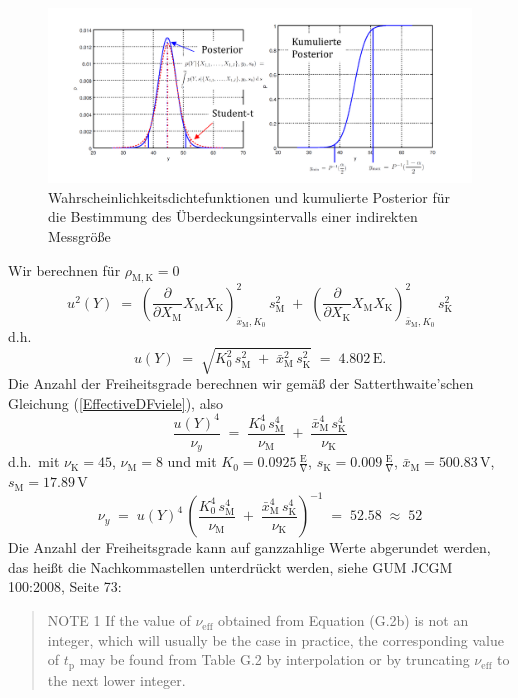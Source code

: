 \begin{figure}
\begin{center}
\includegraphics[width=160mm]{07_vorlesung/media/Ueberdeckungsintervall_0.pdf}
\caption{\label{VergleichsBeispiel}Wahrscheinlichkeitsdichtefunktionen und kumulierte Posterior
für die Bestimmung des Überdeckungsintervalls einer indirekten Messgröße}
\end{center}
\end{figure}
Wir berechnen für $\rho_{\mathrm{M}, \mathrm{K}} = 0$
$$
u^2(Y) \; = \;
\left(\frac{\partial}{\partial X_\mathrm{M}} X_\mathrm{M} X_\mathrm{K} 
\right)^2_{\bar x_\mathrm{M}, K_0} \, s_\mathrm{M}^2 \; + \;
\left(\frac{\partial}{\partial X_\mathrm{K}} X_\mathrm{M} X_\mathrm{K} 
\right)^2_{\bar x_\mathrm{M}, K_0} \, s_\mathrm{K}^2
$$
d.h.
$$
u(Y) \; = \;
\sqrt{ K_0^2 \, s_\mathrm{M}^2 \; + \; \bar x_\mathrm{M}^2 \, s_\mathrm{K}^2 }
\; = \; 4.802 \, \mathrm{E} .
$$
Die Anzahl der Freiheitsgrade berechnen wir gemäß der Satterthwaite'schen Gleichung
(\ref{EffectiveDFviele}), also
$$
\frac{u(Y)^4}{\nu_y} \; = \; \frac{K_0^4 \, s_\mathrm{M}^4}{\nu_\mathrm{M}} \; + \;
\frac{\bar x_\mathrm{M}^4 \, s_\mathrm{K}^4}{\nu_\mathrm{K}}
$$
d.h.\ mit $\nu_\mathrm{K} = 45$, $\nu_\mathrm{M} = 8$ und mit
$K_0 = 0.0925 \, \frac{\mathrm{E}}{\mathrm{V}}$, $s_\mathrm{K}=0.009 \, \frac{\mathrm{E}}{\mathrm{V}}$,
$\bar x_\mathrm{M} = 500.83 \, \mathrm{V}$, $s_\mathrm{M} = 17.89 \, \mathrm{V}$
$$
\nu_y \; = \; u(Y)^4 \, \left( \frac{K_0^4 \, s_\mathrm{M}^4}{\nu_\mathrm{M}} \; + \;
\frac{\bar x_\mathrm{M}^4 \, s_\mathrm{K}^4}{\nu_\mathrm{K}} \right)^{-1} \; = \;
52.58 \; \approx \; 52
$$
Die Anzahl der Freiheitsgrade kann auf ganzzahlige Werte abgerundet werden, das heißt die Nachkommastellen
 unterdrückt werden, siehe GUM JCGM 100:2008, Seite 73:
\begin{quote}
NOTE 1 If the value of $\nu_\mathrm{eff}$ obtained from Equation (G.2b) is not an integer,
which will usually be the case in practice, the corresponding value of $t_\mathrm{p}$ may be found
from Table G.2 by interpolation or by truncating $\nu_\mathrm{eff}$ to the next lower integer.
\end{quote}
